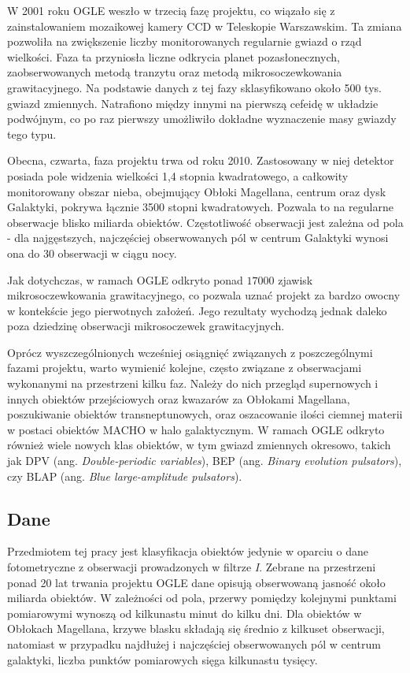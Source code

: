\documentclass{pracalicmgr}
\begin{document}
    W 2001 roku OGLE weszło w trzecią fazę projektu, co wiązało się z zainstalowaniem mozaikowej kamery CCD w Teleskopie Warszawskim. Ta zmiana pozwoliła na zwiększenie liczby monitorowanych regularnie gwiazd o rząd wielkości. Faza ta przyniosła liczne odkrycia planet pozasłonecznych, zaobserwowanych metodą tranzytu oraz metodą mikrosoczewkowania grawitacyjnego. Na podstawie danych z tej fazy sklasyfikowano około 500 tys. gwiazd zmiennych. Natrafiono między innymi na pierwszą cefeidę w układzie podwójnym, co po raz pierwszy umożliwiło dokładne wyznaczenie masy gwiazdy tego typu.
    
    Obecna, czwarta, faza projektu trwa od roku 2010. Zastosowany w niej detektor posiada pole widzenia wielkości 1,4 stopnia kwadratowego, a całkowity monitorowany obszar nieba, obejmujący Obłoki Magellana, centrum oraz dysk Galaktyki, pokrywa łącznie 3500 stopni kwadratowych. Pozwala to na regularne obserwacje blisko miliarda obiektów. Częstotliwość obserwacji jest zależna od pola - dla najgęstszych, najczęściej obserwowanych pól w centrum Galaktyki wynosi ona do 30 obserwacji w ciągu nocy.
    
    Jak dotychczas, w ramach OGLE odkryto ponad $17000$ zjawisk mikrosoczewkowania grawitacyjnego, co pozwala uznać projekt za bardzo owocny w kontekście jego pierwotnych założeń. Jego rezultaty wychodzą jednak daleko poza dziedzinę obserwacji mikrosoczewek grawitacyjnych. 
    
    Oprócz  wyszczególnionych wcześniej osiągnięć związanych z poszczególnymi fazami projektu, warto wymienić kolejne, często związane z obserwacjami wykonanymi na przestrzeni kilku faz. Należy do nich przegląd supernowych i innych obiektów przejściowych oraz kwazarów za Obłokami Magellana, poszukiwanie obiektów transneptunowych, oraz oszacowanie ilości ciemnej materii w postaci obiektów MACHO w halo galaktycznym. W ramach OGLE odkryto również wiele nowych klas obiektów, w tym gwiazd zmiennych okresowo, takich jak DPV (ang. \textit{Double-periodic variables}), BEP (ang. \textit{Binary evolution pulsators}), czy BLAP (ang. \textit{Blue large-amplitude pulsators}).
    
	\subsection{Dane}
    Przedmiotem tej pracy jest klasyfikacja obiektów jedynie w oparciu o dane fotometryczne z obserwacji prowadzonych w filtrze \textit{I}. Zebrane na przestrzeni ponad 20 lat trwania projektu OGLE dane  opisują obserwowaną jasność około miliarda obiektów. W zależności od pola, przerwy pomiędzy kolejnymi punktami pomiarowymi wynoszą od kilkunastu minut do kilku dni. Dla obiektów w Obłokach Magellana, krzywe blasku składają się średnio z kilkuset obserwacji, natomiast w przypadku najdłużej i najczęściej obserwowanych pól w centrum galaktyki, liczba punktów pomiarowych sięga kilkunastu tysięcy. 
\end{document}
